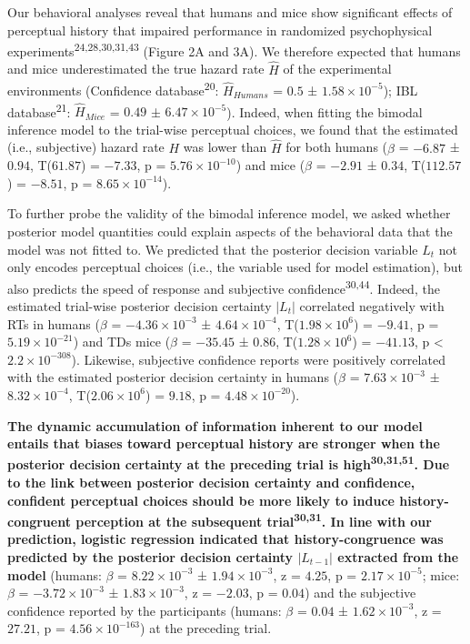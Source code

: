 \documentclass[
]{article}
\begin{document}
Our behavioral analyses reveal that humans and mice show significant
effects of perceptual history that impaired performance in randomized
psychophysical experiments\textsuperscript{24,28,30,31,43} (Figure 2A
and 3A). We therefore expected that humans and mice underestimated the
true hazard rate \(\hat{H}\) of the experimental environments
(Confidence database\textsuperscript{20}: \(\hat{H}_{Humans}\) = \(0.5\)
± \(\ensuremath{1.58\times 10^{-5}}\)); IBL
database\textsuperscript{21}: \(\hat{H}_{Mice}\) = \(0.49\) ±
\(\ensuremath{6.47\times 10^{-5}}\)). Indeed, when fitting the bimodal
inference model to the trial-wise perceptual choices, we found that the
estimated (i.e., subjective) hazard rate \(H\) was lower than
\(\hat{H}\) for both humans (\(\beta\) = \(-6.87\) ± \(0.94\),
T(\(61.87\)) = \(-7.33\), p = \(\ensuremath{5.76\times 10^{-10}}\)) and
mice (\(\beta\) = \(-2.91\) ± \(0.34\), T(\(112.57\)) = \(-8.51\), p =
\(\ensuremath{8.65\times 10^{-14}}\)).

To further probe the validity of the bimodal inference model, we asked
whether posterior model quantities could explain aspects of the
behavioral data that the model was not fitted to. We predicted that the
posterior decision variable \(L_t\) not only encodes perceptual choices
(i.e., the variable used for model estimation), but also predicts the
speed of response and subjective confidence\textsuperscript{30,44}.
Indeed, the estimated trial-wise posterior decision certainty \(|L_t|\)
correlated negatively with RTs in humans (\(\beta\) =
\(\ensuremath{-4.36\times 10^{-3}}\) ±
\(\ensuremath{4.64\times 10^{-4}}\),
T(\(\ensuremath{1.98\times 10^{6}}\)) = \(-9.41\), p =
\(\ensuremath{5.19\times 10^{-21}}\)) and TDs mice (\(\beta\) =
\(-35.45\) ± \(0.86\), T(\(\ensuremath{1.28\times 10^{6}}\)) =
\(-41.13\), p < \(\ensuremath{2.2\times 10^{-308}}\)). Likewise, subjective confidence reports were
positively correlated with the estimated posterior decision certainty in
humans (\(\beta\) = \(\ensuremath{7.63\times 10^{-3}}\) ±
\(\ensuremath{8.32\times 10^{-4}}\),
T(\(\ensuremath{2.06\times 10^{6}}\)) = \(9.18\), p =
\(\ensuremath{4.48\times 10^{-20}}\)).

\textbf{The dynamic accumulation of information inherent to our model
entails that biases toward perceptual history are stronger when the
posterior decision certainty at the preceding trial is
high\textsuperscript{30,31,51}. Due to the link between posterior
decision certainty and confidence, confident perceptual choices should
be more likely to induce history-congruent perception at the subsequent
trial\textsuperscript{30,31}. In line with our prediction, logistic
regression indicated that history-congruence was predicted by the
posterior decision certainty \(|L_{t-1}|\) extracted from the model}
(humans: \(\beta\) = \(\ensuremath{8.22\times 10^{-3}}\) ±
\(\ensuremath{1.94\times 10^{-3}}\), z = \(4.25\), p =
\(\ensuremath{2.17\times 10^{-5}}\); mice: \(\beta\) =
\(\ensuremath{-3.72\times 10^{-3}}\) ±
\(\ensuremath{1.83\times 10^{-3}}\), z = \(-2.03\), p = \(0.04\)) and
the subjective confidence reported by the participants (humans:
\(\beta\) = \(0.04\) ± \(\ensuremath{1.62\times 10^{-3}}\), z =
\(27.21\), p = \(\ensuremath{4.56\times 10^{-163}}\)) at the preceding
trial.
\end{document}
